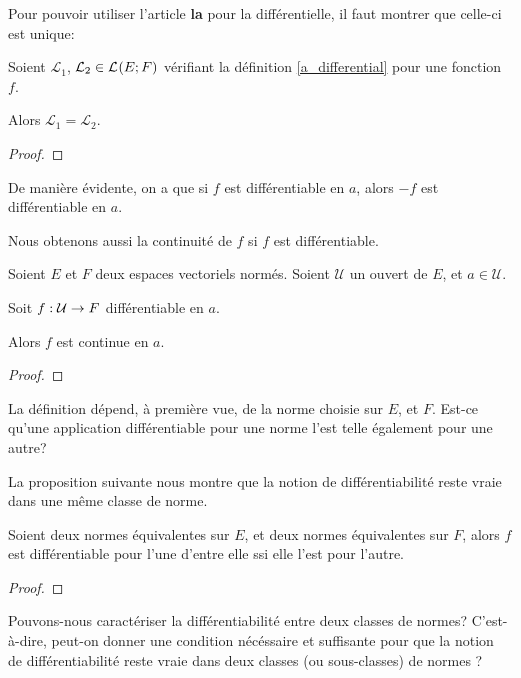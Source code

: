 Pour pouvoir utiliser l'article \textbf{la} pour la différentielle, il faut
montrer que celle-ci est unique:

\begin{proposition}
	Soient $\mathcal{L}_{1}$, $\mathcal{L}_{2} \in \mathcal{L}_{}(E; F)$
	vérifiant la définition \ref{a_differential} pour une fonction $f$.

	Alors $\mathcal{L}_{1} = \mathcal{L}_{2}$.
\end{proposition}

\ifdefined\outputproof
\begin{proof}

\end{proof}
\fi

De manière évidente, on a que si $f$ est différentiable en $a$, alors $-f$ est
différentiable en $a$.

Nous obtenons aussi la continuité de $f$ si $f$ est différentiable.

\begin{proposition}
	Soient $E$ et $F$ deux espaces vectoriels normés.
	Soient $\mathcal{U}$ un ouvert de $E$, et $a \in \mathcal{U}$.

	Soit $f : \mathcal{U} \rightarrow F$ différentiable en $a$.

	Alors $f$ est continue en $a$.
\end{proposition}

\ifdefined\outputproof
\begin{proof}


\end{proof}
\fi

La définition dépend, à première vue, de la norme choisie sur $E$, et $F$. Est-ce
qu'une application différentiable pour une norme l'est telle également pour une
autre?

La proposition suivante nous montre que la notion de différentiabilité reste
vraie dans une même classe de norme.

\begin{proposition}
	Soient deux normes équivalentes sur $E$, et deux normes équivalentes sur
	$F$, alors $f$ est différentiable pour l'une d'entre elle ssi elle l'est
	pour l'autre.
\end{proposition}

\ifdefined\outputproof
\begin{proof}

\end{proof}
\fi

\begin{question}
	Pouvons-nous caractériser la différentiabilité entre deux classes de
	normes? C'est-à-dire, peut-on donner une condition nécéssaire et suffisante
	pour que la notion de différentiabilité reste vraie dans deux classes (ou
	sous-classes) de normes ?
\end{question}

